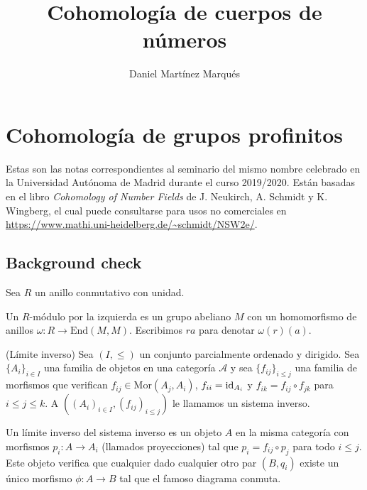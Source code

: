 \documentclass[a4paper,12pt, leqno]{report}
\title{Cohomología de cuerpos de números}
\author{Daniel Martínez Marqués}
\begin{document}
\chapter*{Cohomología de grupos profinitos}

Estas son las notas correspondientes al seminario del mismo nombre celebrado en la Universidad Autónoma de Madrid durante el curso 2019/2020. Están basadas en el libro \textit{Cohomology of Number Fields} de J. Neukirch, A. Schmidt y K. Wingberg, el cual puede consultarse para usos no comerciales en \url{https://www.mathi.uni-heidelberg.de/~schmidt/NSW2e/}. 
\begin{center}
\cc \ccby \ccnc
\end{center}

\section*{Background check}
Sea $R$ un anillo conmutativo con unidad.
\begin{definicion}
	Un $R$-módulo por la izquierda es un grupo abeliano $M$ con un homomorfismo de anillos $\omega: R \rightarrow \mathrm{End}(M,M)$. Escribimos $ra$ para denotar $\omega(r)(a)$.
\end{definicion}
\begin{definicion} (Límite inverso)
	Sea $(I,\leq)$ un conjunto parcialmente ordenado y dirigido. Sea $\{A_i\}_{i \in I}$ una familia de objetos en una categoría $\mathcal{A}$ y sea $\{f_{ij}\}_{i\leq j}$ una familia de morfismos que verifican $f_{ij}\in \mathrm{Mor}(A_j,A_i)$, $f_{ii}=\mathrm{id}_{A_i}$ y $f_{ik}=f_{ij}\circ f_{jk}$ para $i\leq j \leq k$. A $((A_i)_{i \in I}, (f_{ij})_{i\leq j})$ le llamamos un sistema inverso.
	
	Un límite inverso del sistema inverso es un objeto $A$ en la misma categoría con morfismos $p_i: A \rightarrow A_i$ (llamados proyecciones) tal que $p_i = f_{ij}\circ p_j$ para todo $i\leq j$. Este objeto verifica que cualquier dado cualquier otro par $(B,q_i)$ existe un único morfismo $\phi: A \rightarrow B$ tal que el famoso diagrama conmuta. 
\end{definicion}
\end{document}
